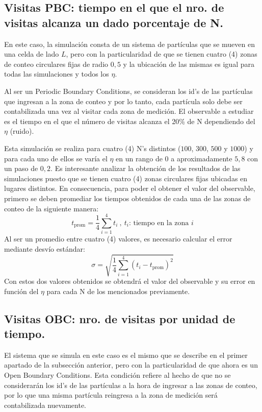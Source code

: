 \documentclass[11pt, a4paper]{article}
\begin{document}
        \subsection{Visitas PBC: tiempo en el que el nro. de visitas alcanza un dado porcentaje de N.}
            En este caso, la simulación consta de un sistema de partículas que se mueven en una celda de lado $L$,
            pero con la particularidad de que se tienen cuatro (4) zonas de conteo circulares fijas de radio $0,5$ y la
            ubicación de las mismas es igual para todas las simulaciones y todos los $\eta$.

            Al ser un Periodic Boundary Conditions, se consideran los id's de las partículas que ingresan a la zona de
            conteo y por lo tanto, cada partícula solo debe ser contabilizada una vez al visitar cada zona de medición.
            El observable a estudiar es el tiempo en el que el número de visitas alcanza el 20\% de N dependiendo
            del $\eta$ (ruido).

            Esta simulación se realiza para cuatro (4) N's distintos ($100$, $300$, $500$ y $1000$) y para cada uno de ellos
            se varía el $\eta$ en un rango de $0$ a aproximadamente $5,8$ con un paso de $0,2$. Es interesante analizar la
            obtención de los resultados de las simulaciones puesto que se tienen cuatro (4) zonas circulares fijas ubicadas en lugares
            distintos. En consecuencia, para poder el obtener el valor del observable, primero se deben promediar los tiempos obtenidos
            de cada una de las zonas de conteo de la siguiente manera:
            \begin{equation}
                t_{\text{prom}} = \frac{1}{4} \sum_{i=1}^{4} t_i \ ,\ t_i\text{: tiempo en la zona }i
            \end{equation}
            Al ser un promedio entre cuatro (4) valores, es necesario calcular el error mediante desvío estándar:
            \begin{equation}
                \sigma = \sqrt{\frac{1}{4} \sum_{i=1}^{4} (t_i - t_{\text{prom}})^2}
            \end{equation}
            Con estos dos valores obtenidos se obtendrá el valor del observable y su error en función del $\eta$ para cada N de los mencionados previamente.


    \subsection{Visitas OBC: nro. de visitas por unidad de tiempo.}
            El sistema que se simula en este caso es el mismo que se describe en el primer apartado de la subsección
            anterior, pero con la particularidad de que ahora es un Open Boundary Conditions. Esta condición refiere
            al hecho de que no se considerarán los id's de las partículas a la hora de ingresar a las zonas de conteo,
            por lo que una misma partícula reingresa a la zona de medición será contabilizada nuevamente.
\end{document}
